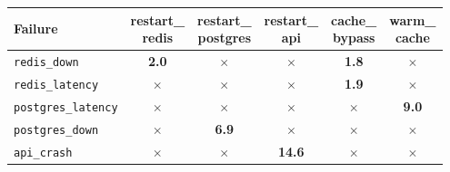 \begin{tabular}{@{}lccccc@{}}
\toprule
Failure & \shortstack{restart\_\\redis} & \shortstack{restart\_\\postgres} & \shortstack{restart\_\\api} & \shortstack{cache\_\\bypass} & \shortstack{warm\_\\cache} \\
\midrule
\texttt{redis\_down} & \textbf{2.0} & $\times$ & $\times$ & \textbf{1.8} & $\times$ \\
\texttt{redis\_latency} & $\times$ & $\times$ & $\times$ & \textbf{1.9} & $\times$ \\
\texttt{postgres\_latency} & $\times$ & $\times$ & $\times$ & $\times$ & \textbf{9.0} \\
\texttt{postgres\_down} & $\times$ & \textbf{6.9} & $\times$ & $\times$ & $\times$ \\
\texttt{api\_crash} & $\times$ & $\times$ & \textbf{14.6} & $\times$ & $\times$ \\
\bottomrule
\end{tabular}